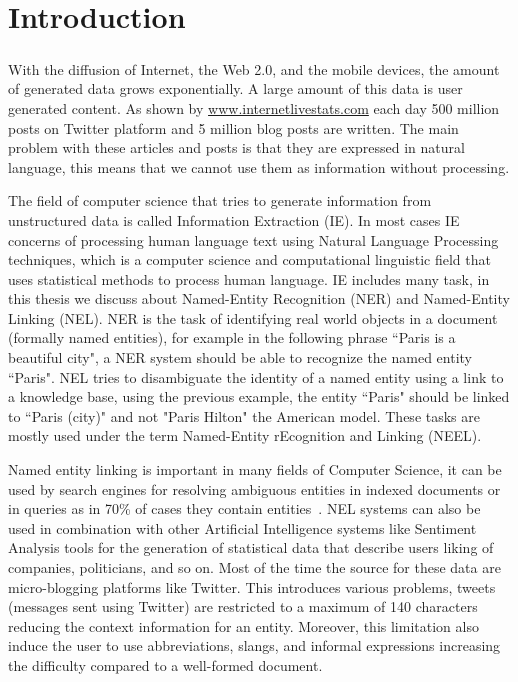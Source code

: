 \chapter{Introduction}
\paragraph{}
With the diffusion of Internet, the Web 2.0, and the mobile devices, the amount of  generated data grows exponentially. A large amount of this data is user generated content. As shown by \href{http://www.internetlivestats.com/}{www.internetlivestats.com} each day 500 million posts on Twitter platform and 5 million blog posts are written. The main problem with these articles and posts is that they are expressed in natural language, this means that we cannot use them as information without processing.

The field of computer science that tries to generate information from unstructured data is called Information Extraction (IE). In most cases IE concerns of processing human language text using Natural Language Processing techniques, which is a computer science and computational linguistic field that uses statistical methods to process human language. IE includes many task, in this thesis we discuss about Named-Entity Recognition (NER) and Named-Entity Linking (NEL). NER is the task of identifying real world objects in a document (formally named entities), for example in the following phrase ``Paris is a beautiful city", a NER system should be able to recognize the named entity ``Paris". NEL tries to disambiguate the identity of a named entity using a link to a knowledge base, using the previous example, the entity ``Paris" should be linked to ``Paris (city)" and not "Paris Hilton" the American model.  These tasks are mostly used under the term Named-Entity rEcognition and Linking (NEEL). 

Named entity linking is important in many fields of Computer Science, it can be used by search engines for resolving ambiguous entities in indexed documents or in queries as in 70\% of cases they contain entities~\cite{pound2010ad}. NEL systems can also be used in combination with other Artificial Intelligence systems like Sentiment Analysis tools for the generation of statistical data that describe users liking of companies, politicians, and so on. Most of the time the source for these data are micro-blogging platforms like Twitter. This introduces various problems, tweets (messages sent using Twitter) are restricted to a maximum of 140 characters reducing the context information for an entity. Moreover, this limitation also induce the user to use abbreviations, slangs, and informal expressions increasing the difficulty compared to a well-formed document.


